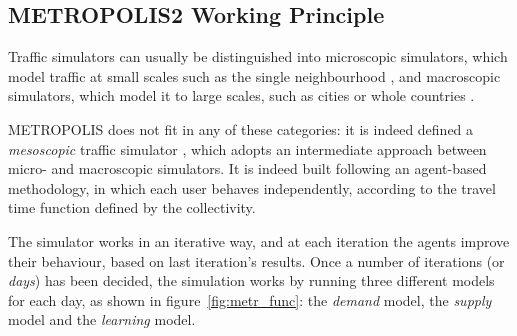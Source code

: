 \subsection{METROPOLIS2 Working Principle}
\label{sec:metr}

Traffic simulators can usually be distinguished into microscopic simulators,
which model traffic at small scales such as the single neighbourhood \parencite{8569938},
and macroscopic simulators, which model it to large scales,
such as cities or whole countries \parencite{mcnally2007four}.

METROPOLIS does not fit in any of these categories:
it is indeed defined a \textit{mesoscopic} traffic simulator \parencite{RePEc:ema:worpap:2024-03},
which adopts an intermediate approach between micro- and macroscopic simulators.
It is indeed built following an agent-based methodology,
in which each user behaves independently,
according to the travel time function defined by the collectivity.

The simulator works in an iterative way,
and at each iteration the agents improve their behaviour,
based on last iteration's results.
Once a number of iterations (or \textit{days}) has been decided,
the simulation works by running three different models for each day, as shown in figure~\ref{fig:metr_func}:
the \textit{demand} model, the \textit{supply} model and the \textit{learning} model.

